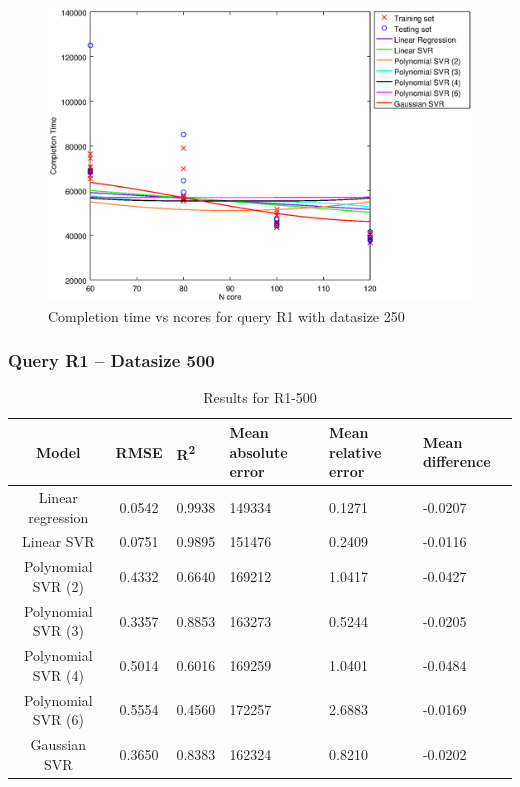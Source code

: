 \documentclass[a4paper,11pt]{article}
\begin{document}
\begin {figure}[hbtp]
\centering
\includegraphics[width=\textwidth]{output/R1_250_LINEAR_NCORE/plot_R1_250.eps}
\caption{Completion time vs ncores for query R1 with datasize 250}
\label{fig:all_linear_R1_250}
\end {figure}

\newpage
\subsubsection{Query R1 -- Datasize 500}
\begin{table}[H]
	\centering
	\begin{adjustbox}{center}
		\begin{tabular}{c | c M{1.2cm} M{2.5cm} M{2.5cm} M{1.8cm}}
			Model & RMSE & R\textsuperscript{2} & Mean absolute error & Mean relative error & Mean difference \tabularnewline
			\hline
			Linear regression & 0.0542 & 0.9938 & 149334 & 0.1271 & -0.0207 \\
			Linear SVR & 0.0751 & 0.9895 & 151476 & 0.2409 & -0.0116 \\
			Polynomial SVR (2) & 0.4332 & 0.6640 & 169212 & 1.0417 & -0.0427 \\
			Polynomial SVR (3) & 0.3357 & 0.8853 & 163273 & 0.5244 & -0.0205 \\
			Polynomial SVR (4) & 0.5014 & 0.6016 & 169259 & 1.0401 & -0.0484 \\
			Polynomial SVR (6) & 0.5554 & 0.4560 & 172257 & 2.6883 & -0.0169 \\
			Gaussian SVR & 0.3650 & 0.8383 & 162324 & 0.8210 & -0.0202 \\
		\end{tabular}
	\end{adjustbox}
	\\
	\caption{Results for R1-500}
	\label{fig:all_linear_R1_500}
\end{table}
\end{document}
